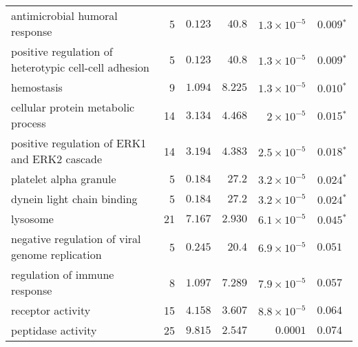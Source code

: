 \begin{longtable*}{|l|r|r|r|r|r|}
    antimicrobial humoral response                        & 5                       & $ 0.123$                & $  40.8$     & $1.3\times 10^{-5}$  & $\bm{ 0.009{^*}}$               \\
    positive regulation of heterotypic cell-cell adhesion & 5                       & $ 0.123$                & $  40.8$     & $1.3\times 10^{-5}$ & $\bm{ 0.009{^*}}$ \\
    hemostasis                                            & 9                       & $ 1.094$                & $ 8.225$   & $1.3\times 10^{-5}$  & $\bm{ 0.010{^*}}$               \\
    cellular protein metabolic process                    & 14                      & $ 3.134$                & $ 4.468$   & $ 2\times 10^{-5}$   & $\bm{ 0.015{^*}}$               \\
    positive regulation of ERK1 and ERK2 cascade          & 14                      & $ 3.194$                & $ 4.383$   & $2.5\times 10^{-5}$ & $\bm{ 0.018{^*}}$ \\
    platelet alpha granule                                & 5                       & $ 0.184$                & $  27.2$     & $3.2\times 10^{-5}$  & $\bm{ 0.024{^*}}$               \\
    dynein light chain binding                            & 5                       & $ 0.184$                & $  27.2$     & $3.2\times 10^{-5}$  & $\bm{ 0.024{^*}}$               \\
    lysosome                                              & 21                      & $ 7.167$                & $ 2.930$   & $6.1\times 10^{-5}$  & $\bm{ 0.045{^*}}$               \\
    negative regulation of viral genome replication       & 5                       & $ 0.245$                & $  20.4$     & $6.9\times 10^{-5}$ & $ 0.051~~$ \\
    regulation of immune response                         & 8                       & $ 1.097$                & $ 7.289$   & $7.9\times 10^{-5}$  & $ 0.057~~$                      \\
    receptor activity                                     & 15                      & $ 4.158$                & $ 3.607$   & $8.8\times 10^{-5}$  & $ 0.064~~$                      \\
    peptidase activity                                    & 25                      & $ 9.815$                & $ 2.547$   & $0.0001$             & $ 0.074~~$                      \\

\end{longtable*}
